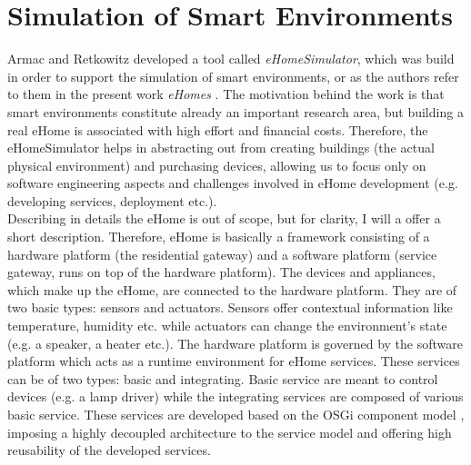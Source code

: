 \section{Simulation of Smart Environments}\label{sec:sim_of_smart_envs}

Armac and Retkowitz developed a tool called \emph{eHomeSimulator}, which was build in order to support the simulation of smart environments, or as the authors refer to them in the present work \emph{eHomes} \cite{armac2007simulation}. The motivation behind the work is that smart environments constitute already an important research area, but building a real eHome is associated with high effort and financial costs. Therefore, the eHomeSimulator helps in abstracting out from creating buildings (the actual physical environment) and purchasing devices, allowing us to focus only on software engineering aspects and challenges involved in eHome development (e.g. developing services, deployment etc.).\\

Describing in details the eHome is out of scope, but for clarity, I will a offer a short description. Therefore, eHome is basically a framework consisting of a hardware platform (the residential gateway) and a software platform (service gateway, runs on top of the hardware platform). The devices and appliances, which make up the eHome, are connected to the hardware platform. They are of two basic types: sensors and actuators. Sensors offer contextual information like temperature, humidity etc. while actuators can change the environment's state (e.g. a speaker, a heater etc.). The hardware platform is governed by the software platform which acts as a runtime environment for eHome services. These services can be of two types: basic and integrating. Basic service are meant to control devices (e.g. a lamp driver) while the integrating services are composed of various basic service. These services are developed based on the OSGi component model \cite{allianceosgi}, imposing a highly decoupled architecture to the service model and offering high reusability of the developed services.\\


